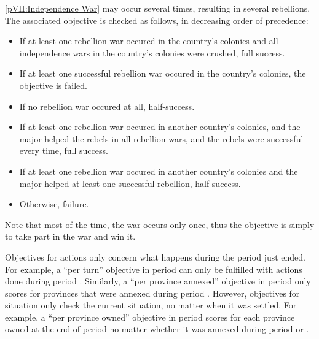  \label{chVictories:Explanation:Independence}
\ref{pVII:Independence War} may occur several times, resulting in several
rebellions. The associated objective is checked as follows, in
decreasing order of precedence:
\begin{itemize}
\item If at least one rebellion war occured in the country's colonies
  and all independence wars in the country's colonies were crushed, full
  success.
\item If at least one successful rebellion war occured in the country's
  colonies, the objective is failed.
\item If no rebellion war occured at all, half-success.
\item If at least one rebellion war occured in another country's
  colonies, and the major helped the rebels in all rebellion wars, and
  the rebels were successful every time, full success.
\item If at least one rebellion war occured in another country's
  colonies and the major helped at least one successful rebellion,
  half-success.
\item Otherwise, failure.
\end{itemize}
\bparag Note that most of the time, the war occurs only once, thus the
objective is simply to take part in the war and win it.

\aparag[Duration.] Objectives for actions only concern what happens
during the period just ended.
\bparag For example, a ``per turn'' objective in period  can
only be fulfilled with actions done during period
.
\bparag Similarly, a ``per province annexed'' objective in period
 only scores \VPs for provinces that were annexed during
period .
\bparag However, objectives for situation only check the current
situation, no matter when it was settled.
\bparag For example, a ``per province owned'' objective in period
 scores for each province owned at the end of period
 no matter whether it was annexed during period  or
.

